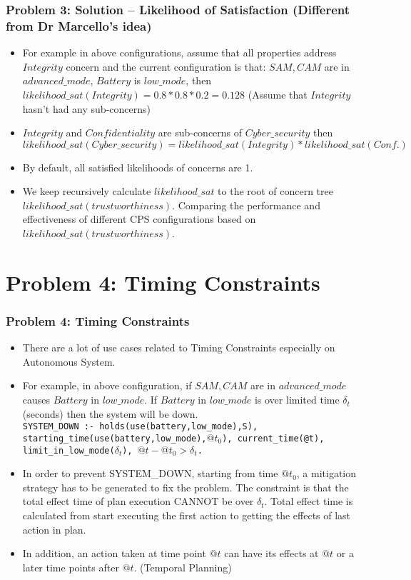 \documentclass{beamer}
\begin{document}
\begin{frame}[fragile]
	\frametitle{Problem 3: Solution -- Likelihood of Satisfaction (Different from Dr Marcello's idea)}
	\begin{itemize}
		\item For example in above configurations, assume that all properties address $Integrity$ concern and the current configuration is that: $SAM,CAM$ are in $advanced\_mode$, $Battery$ is $low\_mode$, then $likelihood\_sat(Integrity) = 0.8*0.8*0.2 = 0.128$ (Assume that $Integrity$ hasn't had any sub-concerns)
		\item $Integrity$ and $Confidentiality$ are sub-concerns of $Cyber\_security$ then $likelihood\_sat(Cyber\_security) = likelihood\_sat(Integrity) * likelihood\_sat(Conf.)$
		\item By default, all satisfied likelihoods of concerns are 1. 
		\item We keep recursively calculate $likelihood\_sat$ to the root of concern tree $likelihood\_sat(trustworthiness)$. Comparing the performance and effectiveness of different CPS configurations based on $likelihood\_sat(trustworthiness)$. 	
	\end{itemize}
\end{frame}

\section{Problem 4: Timing Constraints} 
\begin{frame}
	\frametitle{Problem 4: Timing Constraints}
	\begin{itemize}
		\item There are a lot of use cases related to Timing Constraints especially on Autonomous System. 
		\item For example, in above configuration, if $SAM,CAM$ are in $advanced\_mode$ causes $Battery$ in $low\_mode$. If $Battery$ in $low\_mode$ is over limited time $\delta_t$ (seconds) then the system will be down. \\
		{\tt SYSTEM\_DOWN :- holds(use(battery,low\_mode),S), starting\_time(use(battery,low\_mode),$@t_0$), current\_time(@t), limit\_in\_low\_mode($\delta_t$), $@t - @t_0 > \delta_t$.}
		\item In order to prevent SYSTEM\_DOWN, starting from time $@t_0$, a mitigation strategy has to be generated to fix the problem. The constraint is that the total effect time of plan execution CANNOT be over $\delta_t$. Total effect time is calculated from start executing the first action to getting the effects of last action in plan. 
		\item In addition, an action taken at time point $@t$ can have its effects at $@t$ or a later time points after $@t$. (Temporal Planning) 
	\end{itemize}
\end{frame}
\end{document}
